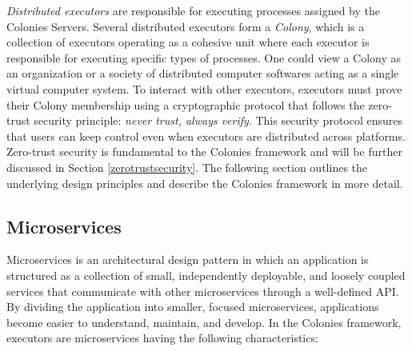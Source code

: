 \documentclass{article}
\begin{document}
\emph{Distributed executors} are responsible for executing processes assigned by the Colonies Servers. Several distributed executors form a \emph{Colony}, which is a collection of executors operating as a cohesive unit where each executor is responsible for executing specific types of processes. One could view a Colony as an organization or a society of distributed computer softwares acting as a single virtual computer system. To interact with other executors, executors must prove their Colony membership using a cryptographic protocol that follows the zero-trust security principle: \emph{never trust, always verify}. This security protocol ensures that users can keep control even when executors are distributed across platforms. Zero-trust security is fundamental to the Colonies framework and will be further discussed in Section \ref{zerotrustsecurity}. The following section outlines the underlying design principles and describe the Colonies framework in more detail. 

\subsection{Microservices}
Microservices \cite{microservices} is an architectural design pattern in which an application is structured as a collection of small, independently deployable, and loosely coupled services that communicate with other microservices through a well-defined API. By dividing the application into smaller, focused microservices, applications become easier to understand, maintain, and develop. In the Colonies framework, executors are microservices having the following characteristics:
\end{document}
